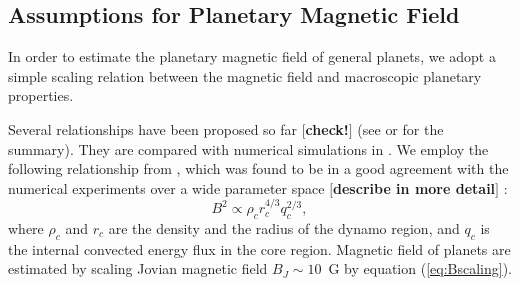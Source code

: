 \documentclass{emulateapj}
\def\memoYF#1{\color{red}$[${\bf #1}$]$ \color{black}}
\begin{document}

\subsection{Assumptions for Planetary Magnetic Field}
\label{ss:magneticfield}

In order to estimate the planetary magnetic field of general planets, we adopt a simple scaling relation between the magnetic field and macroscopic planetary properties. 

Several relationships have been proposed so far \citep[e.g.][]{russel1978,busse1976,stevenson1979,mizutani1992,sano1993,starchenko2002,christensen2006} \memoYF{check!} (see \citet{griebmeier2004} or \citet{christensen2010} for the summary). 
%
They are compared with numerical simulations in \citet{christensen2010}. We employ the following relationship from \citet{christensen2006}, which was found to be in a good agreement with the numerical experiments over a wide parameter space \memoYF{describe in more detail}:
\begin{equation}
B^2 \propto \rho_c r_c^{4/3} q_c^{2/3}, \label{eq:Bscaling} %
\end{equation}
where $\rho _c$ and $r_c$ are the density and the radius of the dynamo region, and $q_c$ is the internal convected energy flux in the core region. 
Magnetic field of planets are estimated by scaling Jovian magnetic field $B_J \sim 10$~G by equation (\ref{eq:Bscaling}). 
\end{document}
